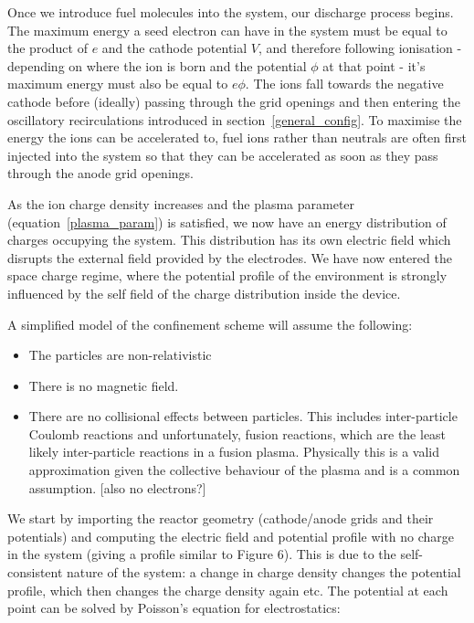 \documentclass[a4paper,titlepage]{article}
\let\cite\parencite
\begin{document}
\begin{flushleft}
Once we introduce fuel molecules into the system, our discharge process begins. The maximum energy a seed electron can have in the system must be equal to the product of $e$ and the cathode potential $V$, and therefore following ionisation - depending on where the ion is born and the potential $\phi$ at that point - it's maximum energy must also be equal to $e\phi$. The ions fall towards the negative cathode before (ideally) passing through the grid openings and then entering the oscillatory recirculations introduced in section~\ref{general_config}. To maximise the energy the ions can be accelerated to, fuel ions rather than neutrals are often first injected into the system so that they can be accelerated as soon as they pass through the anode grid openings. 

As the ion charge density increases and the plasma parameter (equation~\ref{plasma_param}) is satisfied, we now have an energy distribution of charges occupying the system. This distribution has its own electric field which disrupts the external field provided by the electrodes. We have now entered the space charge regime, where the potential profile of the environment is strongly influenced by the self field of the charge distribution inside the device. \cite{ferrario_2013_space_charge} \newline

A simplified model of the confinement scheme will assume the following:

\begin{itemize}
    \item The particles are non-relativistic
    \item There is no magnetic field. 
    \item There are no collisional effects between particles. This includes inter-particle Coulomb reactions and unfortunately, fusion reactions, which are the least likely inter-particle reactions in a fusion plasma. Physically this is a valid approximation given the collective behaviour of the plasma and is a common assumption. \cite{freidberg_2008_plasma} 
    [also no electrons?]
\end{itemize}

We start by importing the reactor geometry (cathode/anode grids and their potentials) and computing the electric field and potential profile with no charge in the system (giving a profile similar to Figure 6). This is due to the self-consistent nature of the system: a change in charge density changes the potential profile, which then changes the charge density again etc. The potential at each point can be solved by Poisson's equation for electrostatics: 


\end{flushleft}
\end{document}
